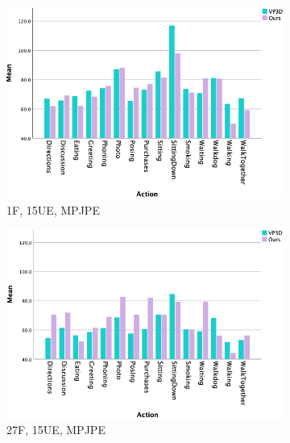 \documentclass[10pt,twocolumn,letterpaper]{article}
\begin{document}
\begin{figure}
     \centering
     \begin{subfigure}[b]{0.49\textwidth}
         \centering
         \includegraphics[width=\textwidth]{mean_error_comparison.png}
         \caption{1F, 15UE, MPJPE}
         \label{fig:est_a}
     \end{subfigure}
     \hfill
     \begin{subfigure}[b]{0.49\textwidth}
         \centering
         \includegraphics[width=\textwidth]{mean_error_comparison_2.png}
         \caption{27F, 15UE, MPJPE}
         \label{fig:est_b}
     \end{subfigure}
     \quad
     \begin{subfigure}[b]{0.49\textwidth}
         \centering

\end{subfigure}
\end{figure}
\end{document}
